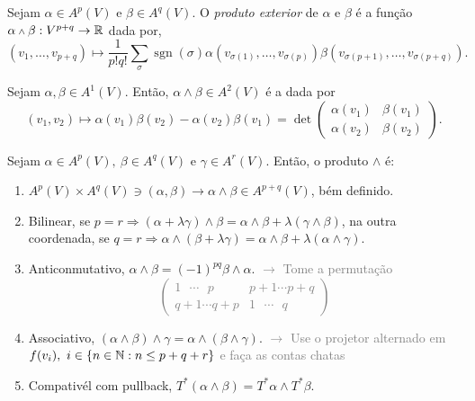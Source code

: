 \begin{definition}
    Sejam \(\alpha \in A^p(V)\) e \(\beta \in A^q(V)\). O \emph{produto exterior} de \(\alpha\) e \(\beta\) é a função \(\alpha \wedge \beta : V^{p+q} \to \R\) dada por,  
    {\[(v_1, \ldots, v_{p+q}) \mapsto \frac{1}{p!q!} \sum_\sigma \operatorname{sgn}(\sigma) \alpha(v_{\sigma(1)}, \ldots, v_{\sigma(p)}) \beta(v_{\sigma(p+1)},\ldots, v_{\sigma(p+q)}).\]}
\end{definition}

\begin{example}
    Sejam \(\alpha, \beta \in A^1(V)\). Então,  \(\alpha \wedge \beta \in A^2(V)\) é a dada por
    \vspace{-0.2cm}
    \[(v_1, v_2) \mapsto \alpha(v_1)\beta(v_2) - \alpha(v_2)\beta(v_1) =\det  \begin{pmatrix}
        \alpha(v_1) & \beta(v_1) \\ 
        \alpha(v_2) & \beta(v_2) 
    \end{pmatrix}.\] 
\end{example}


\begin{proposition}
    Sejam \(\alpha \in A^p(V),\ \beta \in A^q(V)\) e \(\gamma \in A^r(V)\). Então, o produto \(\wedge\) é:   
    \begin{enumerate}[label = \roman*.]
        \item \(A^p(V) \times A^q(V) \ni (\alpha, \beta )\to \alpha \wedge \beta \in A^{p+q}(V)\), bém definido.   
        \item Bilinear, se \(p = r \Rightarrow (\alpha + \lambda \gamma) \wedge \beta =  \alpha \wedge \beta + \lambda (\gamma \wedge \beta)\), na outra coordenada, se \(q = r \Rightarrow \alpha  \wedge (\beta+ \lambda \gamma) =  \alpha \wedge \beta + \lambda (\alpha \wedge \gamma) \). %
        \item Anticonmutativo, \(\alpha \wedge \beta =  (-1)^{pq} \beta \wedge \alpha\). \textcolor{gray}{\(\rightarrow \) Tome a permutação \[\begin{pmatrix}
    1\ \ \ \cdots \ \ \  p & p+1  \cdots  p+q\\ 
    q+ 1 \cdots  q+p & 1 \ \ \  \cdots \ \ \  q
\end{pmatrix}\] }
        \item Associativo, \((\alpha \wedge \beta) \wedge \gamma = \alpha \wedge (\beta \wedge \gamma)\). \textcolor{gray}{\(\rightarrow \) Use o projetor alternado em \(f(v_i), \ i \in \{n\in \mathbb{N} : n\leq p+q+r\}\) e faça as contas chatas}
        \item Compativél com pullback, \(T^*(\alpha \wedge \beta) = T^*\alpha \wedge T^*\beta\).   
    \end{enumerate} 
\end{proposition}

